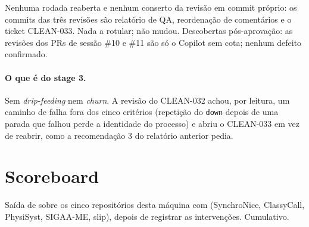 \documentclass[11pt,a4paper]{article}
\begin{document}
Nenhuma rodada reaberta e nenhum conserto da revisão em commit próprio: os
commits das três revisões são relatório de QA, reordenação de comentários e
o ticket CLEAN-033. Nada a rotular;  não
mudou. Descobertas pós-aprovação: as revisões dos PRs de sessão \#10 e \#11
são só o Copilot sem cota; nenhum defeito confirmado.

\paragraph{O que é do stage 3.} Sem \emph{drip-feeding} nem \emph{churn}. A
revisão do CLEAN-032 achou, por leitura, um caminho de falha fora dos cinco
critérios (repetição do \texttt{down} depois de uma parada que falhou perde a
identidade do processo) e abriu o CLEAN-033 em vez de reabrir, como a
recomendação 3 do relatório anterior pedia.

\section{Scoreboard}

Saída de  sobre os cinco repositórios
desta máquina com  (SynchroNice, ClassyCall,
PhysiSyst, SIGAA-ME, slip), depois de registrar as intervenções. Cumulativo.
\end{document}
